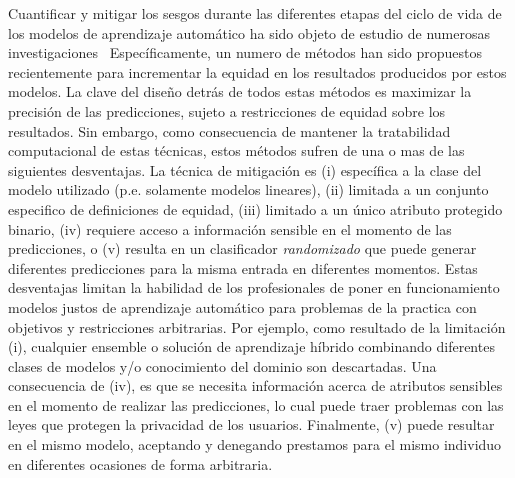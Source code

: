 
Cuantificar y mitigar los sesgos durante las diferentes etapas del ciclo de vida de los modelos de aprendizaje automático ha sido objeto de estudio de numerosas investigaciones~
Específicamente, un numero de métodos han sido propuestos recientemente para incrementar la equidad en los resultados producidos por estos modelos.
La clave del diseño detrás de todos estas métodos es maximizar la precisión de las predicciones, sujeto a restricciones de equidad sobre los resultados.
Sin embargo, como consecuencia de mantener la tratabilidad computacional de estas técnicas, estos métodos sufren de una o mas de las siguientes desventajas.
La técnica de mitigación es
(i) específica a la clase del modelo utilizado (p.e. solamente modelos lineares),
(ii) limitada a un conjunto especifico de definiciones de equidad,
(iii) limitado a un único atributo protegido binario,
(iv) requiere acceso a información sensible en el momento de las predicciones, o
(v) resulta en un clasificador \emph{randomizado} que puede generar diferentes predicciones para la misma entrada en diferentes momentos.
Estas desventajas limitan la habilidad de los profesionales de poner en funcionamiento modelos justos de aprendizaje automático para problemas de la practica con objetivos y restricciones arbitrarias.
Por ejemplo, como resultado de la limitación (i), cualquier ensemble o solución de aprendizaje híbrido combinando diferentes clases de modelos y/o conocimiento del dominio son descartadas.
Una consecuencia de (iv), es que se necesita información acerca de atributos sensibles en el momento de realizar las predicciones, lo cual puede traer problemas con las leyes que protegen la privacidad de los usuarios.
Finalmente, (v) puede resultar en el mismo modelo, aceptando y denegando prestamos para el mismo individuo en diferentes ocasiones de forma arbitraria.


